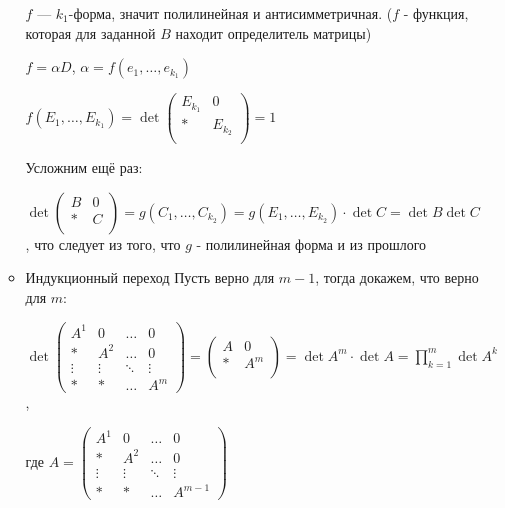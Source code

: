 \begin{enumerate}
\begin{itemize}
                    \(f\) --- \(k_1\)-форма, значит полилинейная и антисимметричная. (\(f\) - функция, которая для заданной \(B\) находит определитель матрицы)

                    \(f =\alpha D\), \(\alpha = f(e_1, \ldots, e_{k_1})\)

                    \(f(E_1, \ldots, E_{k_1}) = \det\begin{pmatrix}
                        E_{k_1} & 0       \\
                        *       & E_{k_2} \\
                    \end{pmatrix} = 1\)


                    Усложним ещё раз:

                    \(\det\begin{pmatrix}
                        B & 0 \\
                        * & C \\
                    \end{pmatrix} = g(C_1,\ldots,C_{k_2}) = g(E_1,\ldots,E_{k_2})\cdot \det C = \det B \det C\), что следует из того, что \(g\) - полилинейная форма и из прошлого

              \item Индукционный переход
                    Пусть верно для \(m - 1\), тогда докажем, что верно для \(m\):

                    \(\det
                    \begin{pmatrix}
                        A^1    & 0      & \ldots & 0      \\
                        *      & A^2    & \ldots & 0      \\
                        \vdots & \vdots & \ddots & \vdots \\
                        *      & *      & \ldots & A^m
                    \end{pmatrix} = \begin{pmatrix}
                        A & 0   \\
                        * & A^m \\
                    \end{pmatrix} = \det A^m \cdot \det A = \prod\limits_{k=1}^m \det A^k \),

                    где
                    \(A =\begin{pmatrix}
                        A^1    & 0      & \ldots & 0       \\
                        *      & A^2    & \ldots & 0       \\
                        \vdots & \vdots & \ddots & \vdots  \\
                        *      & *      & \ldots & A^{m-1}
                    \end{pmatrix} \)
          \end{itemize}


\end{enumerate}
